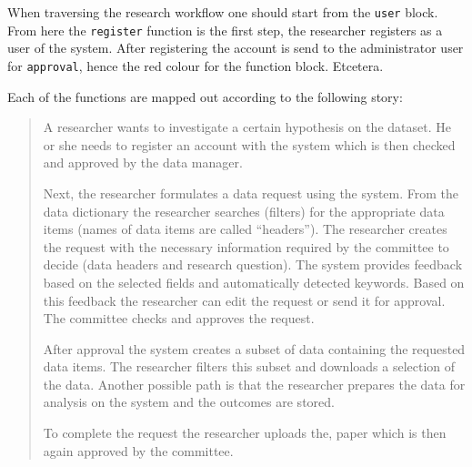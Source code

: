 When traversing the research workflow one should start from the {\tt user} block.
From here the {\tt register} function is the first step, the researcher registers as a user of the system.
After registering the account is send to the administrator user for {\tt approval}, hence the red colour for the function block.
Etcetera.

Each of the functions are mapped out according to the following story:

\begin{quotation}
	\noindent A researcher wants to investigate a certain hypothesis on the \project{} dataset.
	He or she needs to register an account with the system which is then checked and approved by the data manager.
	
	Next, the researcher formulates a data request using the system.
	From the data dictionary the researcher searches (filters) for the appropriate data items (names of data items are called ``headers'').
	The researcher creates the request with the necessary information required by the committee to decide (data headers and research question).
	The system provides feedback based on the selected fields and automatically detected keywords.
	Based on this feedback the researcher can edit the request or send it for approval.
	The committee checks and approves the request.
	
	After approval the system creates a subset of \project{} data containing the requested data items.
	The researcher filters this subset and downloads a selection of the data.
	Another possible path is that the researcher prepares the data for analysis on the system and the outcomes are stored.
	
	To complete the request the researcher uploads the, paper which is then again approved by the committee.
\end{quotation}

